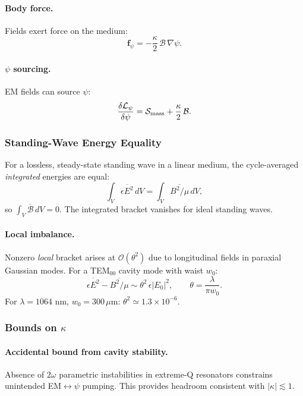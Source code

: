 \paragraph{Body force.}
Fields exert force on the medium:
\begin{equation}
\mathbf{f}_\psi = -\frac{\kappa}{2}\,\mathcal{B}\,\nabla\psi.
\end{equation}

\paragraph{$\psi$ sourcing.}
EM fields can source $\psi$:
\begin{equation}
\frac{\delta\mathcal{L}_\psi}{\delta\psi} = \mathcal{S}_{\rm mass} + \frac{\kappa}{2}\,\mathcal{B}.
\end{equation}

\subsubsection{Standing-Wave Energy Equality}

For a lossless, steady-state standing wave in a linear medium, the cycle-averaged \textit{integrated} energies are equal:
\begin{equation}
\int_V \overline{\epsilon E^2}\,dV = \int_V \overline{B^2/\mu}\,dV,
\end{equation}
so $\int_V \overline{\mathcal{B}}\,dV = 0$. The integrated bracket vanishes for ideal standing waves.

\paragraph{Local imbalance.}
Nonzero \textit{local} bracket arises at $\mathcal{O}(\theta^2)$ due to longitudinal fields in paraxial Gaussian modes. For a TEM$_{00}$ cavity mode with waist $w_0$:
\begin{equation}
\overline{\epsilon E^2} - \overline{B^2/\mu} \sim \theta^2\,\epsilon|E_0|^2, \qquad \theta = \frac{\lambda}{\pi w_0}.
\end{equation}
For $\lambda = 1064$ nm, $w_0 = 300\,\mu$m: $\theta^2 \simeq 1.3 \times 10^{-6}$.

\subsubsection{Bounds on $\kappa$}

\paragraph{Accidental bound from cavity stability.}
Absence of $2\omega$ parametric instabilities in extreme-Q resonators constrains unintended EM$\leftrightarrow\psi$ pumping. This provides headroom consistent with $|\kappa| \lesssim 1$.

